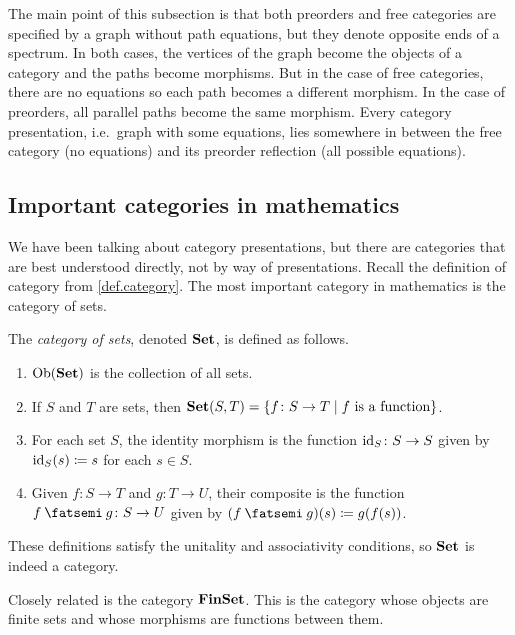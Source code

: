 \documentclass[7Sketches]{subfiles}
\begin{document}
\begin{remark}
The main point of this subsection is that both preorders and free categories are specified by a graph without path equations, but they denote opposite ends of a spectrum. In both cases, the vertices of the graph become the objects of a category and the paths become morphisms. But in the case of free categories, there are no equations so each path becomes a different morphism. In the case of preorders, all parallel paths become the same morphism. Every category presentation, i.e.\ graph with some equations, lies somewhere in between the free category (no equations) and its preorder reflection (all possible equations).
\end{remark}

\subsection{Important categories in mathematics} %
\label{subsec.important_cats}
We have been talking about category presentations, but there are categories that are best understood directly, not by way of presentations. Recall the definition of category from \cref{def.category}. The most important category in mathematics is the category of sets.

\begin{definition}%
\label{def.category_of_sets}%
%
The \emph{category of sets}, denoted $\mathbf{Set}$, is defined as follows.
\begin{enumerate}[label=(\roman*)]
	\item $\operatorname{Ob}(\mathbf{Set})$ is the collection of all sets.
	\item If $S$ and $T$ are sets, then $\mathbf{Set}(S,T)=\{f\colon S\to T\mid f\text{ is a function}\}$.
	\item For each set $S$, the identity morphism is the function $\mathrm{id}_S\colon S\to S$ given by $\mathrm{id}_S(s)\coloneqq s$ for each $s\in S$.
	\item Given $f\colon S\to T$ and $g\colon T\to U$, their composite is the function $f\cp g\colon S\to U$ given by $(f\cp g)(s)\coloneqq g(f(s))$.
\end{enumerate}
These definitions satisfy the unitality and associativity conditions, so $\mathbf{Set}$ is indeed a category.%
%
\end{definition}

Closely related is the category $\mathbf{FinSet}$. This is the category whose
objects are finite sets and whose morphisms are functions between them.
%
\end{document}
